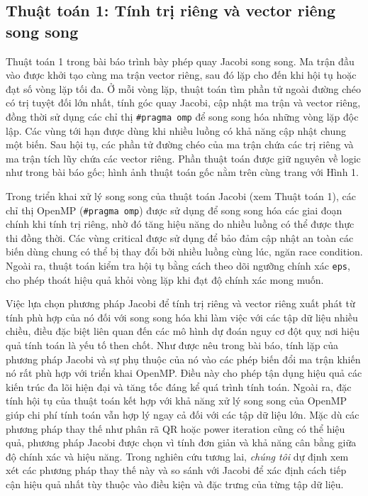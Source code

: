 
\FloatBarrier

\subsection*{Thuật toán 1: Tính trị riêng và vector riêng song song}
Thuật toán 1 trong bài báo trình bày phép quay Jacobi song song. Ma trận đầu vào được khởi tạo cùng ma trận vector riêng, sau đó lặp cho đến khi hội tụ hoặc đạt số vòng lặp tối đa. Ở mỗi vòng lặp, thuật toán tìm phần tử ngoài đường chéo có trị tuyệt đối lớn nhất, tính góc quay Jacobi, cập nhật ma trận và vector riêng, đồng thời sử dụng các chỉ thị \texttt{\#pragma omp} để song song hóa những vòng lặp độc lập. Các vùng tới hạn được dùng khi nhiều luồng có khả năng cập nhật chung một biến. Sau hội tụ, các phần tử đường chéo của ma trận chứa các trị riêng và ma trận tích lũy chứa các vector riêng. Phần thuật toán được giữ nguyên về logic như trong bài báo gốc; hình ảnh thuật toán gốc nằm trên cùng trang với Hình 1.

Trong triển khai xử lý song song của thuật toán Jacobi (xem Thuật toán 1), các chỉ thị OpenMP (\texttt{\#pragma omp}) được sử dụng để song song hóa các giai đoạn chính khi tính trị riêng, nhờ đó tăng hiệu năng do nhiều luồng có thể được thực thi đồng thời. Các vùng critical được sử dụng để bảo đảm cập nhật an toàn các biến dùng chung có thể bị thay đổi bởi nhiều luồng cùng lúc, ngăn race condition. Ngoài ra, thuật toán kiểm tra hội tụ bằng cách theo dõi ngưỡng chính xác \texttt{eps}, cho phép thoát hiệu quả khỏi vòng lặp khi đạt độ chính xác mong muốn.

Việc lựa chọn phương pháp Jacobi để tính trị riêng và vector riêng xuất phát từ tính phù hợp của nó đối với song song hóa khi làm việc với các tập dữ liệu nhiều chiều, điều đặc biệt liên quan đến các mô hình dự đoán nguy cơ đột quỵ nơi hiệu quả tính toán là yếu tố then chốt. Như được nêu trong bài báo, tính lặp của phương pháp Jacobi và sự phụ thuộc của nó vào các phép biến đổi ma trận khiến nó rất phù hợp với triển khai OpenMP. Điều này cho phép tận dụng hiệu quả các kiến trúc đa lõi hiện đại và tăng tốc đáng kể quá trình tính toán. Ngoài ra, đặc tính hội tụ của thuật toán kết hợp với khả năng xử lý song song của OpenMP giúp chi phí tính toán vẫn hợp lý ngay cả đối với các tập dữ liệu lớn. Mặc dù các phương pháp thay thế như phân rã QR hoặc power iteration cũng có thể hiệu quả, phương pháp Jacobi được chọn vì tính đơn giản và khả năng cân bằng giữa độ chính xác và hiệu năng. Trong nghiên cứu tương lai, \textit{chúng tôi} dự định xem xét các phương pháp thay thế này và so sánh với Jacobi để xác định cách tiếp cận hiệu quả nhất tùy thuộc vào điều kiện và đặc trưng của từng tập dữ liệu.

